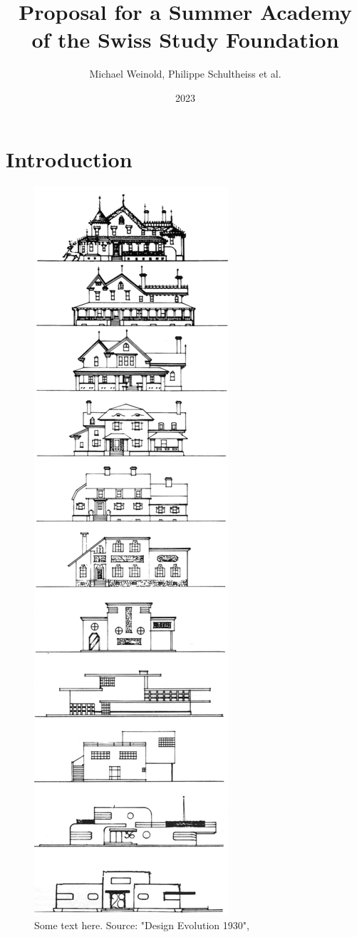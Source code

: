 \documentclass{article}
\title{Proposal for a Summer Academy of the Swiss Study Foundation}
\author{Michael Weinold, Philippe Schultheiss et al.}
\date{2023}
\begin{document}
\maketitle

\tableofcontents

\section{Introduction}

\begin{figure}[]
    \centering
    \includegraphics[height=\textheight]{./figures/loewy_architecture.png}
    \caption{
        Some text here. Source: "Design Evolution 1930", \cite{loewy_industrial_1979}
    }
    \label{fig:combined}
\end{figure}
\end{document}
